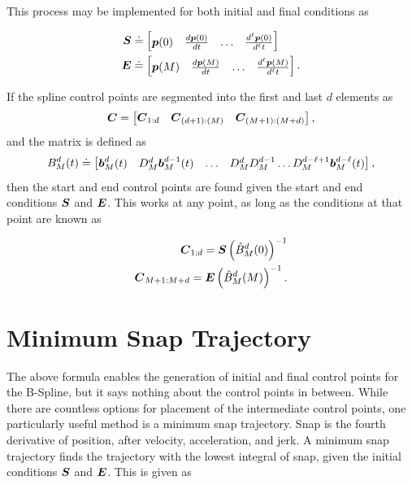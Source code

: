 This process may be implemented for both initial and final conditions as

\begin{align*}
 	\boldsymbol{S} &\doteq \begin{bmatrix}\boldsymbol{p}(0) & \frac{d\boldsymbol{p}(0)}{dt} & \dots & \frac{d^\ell\boldsymbol{p}(0)}{d^\ell t} \end{bmatrix} 	\\
 	\boldsymbol{E} &\doteq \begin{bmatrix}\boldsymbol{p}(M) & \frac{d\boldsymbol{p}(M)}{dt} & \dots & \frac{d^\ell\boldsymbol{p}(M)}{d^\ell t} \end{bmatrix}.
\end{align*}

 If the spline control points are segmented into the first and last $d$ elements as
 \[
 \boldsymbol{C} = \begin{bmatrix}\boldsymbol{C}_{1:d} & \boldsymbol{C}_{(d+1):(M)} & \boldsymbol{C}_{(M+1):(M+d)} \end{bmatrix},
 \]
 and the matrix is defined as
 \[
 B_M^d(t) \doteq \begin{bmatrix} 
 \boldsymbol{b}^d_M(t) & D_M^d \boldsymbol{b}^{d-1}_M(t) & \dots & D_M^d D_M^{d-1}\dots D_M^{d-\ell+1} \boldsymbol{b}^{d-\ell}_M(t)
 				\end{bmatrix},
 \]
then the start and end control points are found given the start and end conditions $\boldsymbol{S}$ and $\boldsymbol{E}$. 
This works at any point, as long as the conditions at that point are known as

\begin{align}
    \boldsymbol{C}_{1:d} = \boldsymbol{S} \left(\hat{B}_M^d(0)\right)^{-1}\\
    \boldsymbol{C}_{M+1:M+d} = \boldsymbol{E} \left(\hat{B}_M^d(M)\right)^{-1}.
\end{align}

\section{Minimum Snap Trajectory}

The above formula enables the generation of initial and final control points for the B-Spline, but it says nothing about the control points in between. 
While there are countless options for placement of the intermediate control points, one particularly useful method is a minimum snap trajectory. 
Snap is the fourth derivative of position, after velocity, acceleration, and jerk. 
A minimum snap trajectory finds the trajectory with the lowest integral of snap, given the initial conditions $\boldsymbol{S}$ and $\boldsymbol{E}$. 
This is given as

